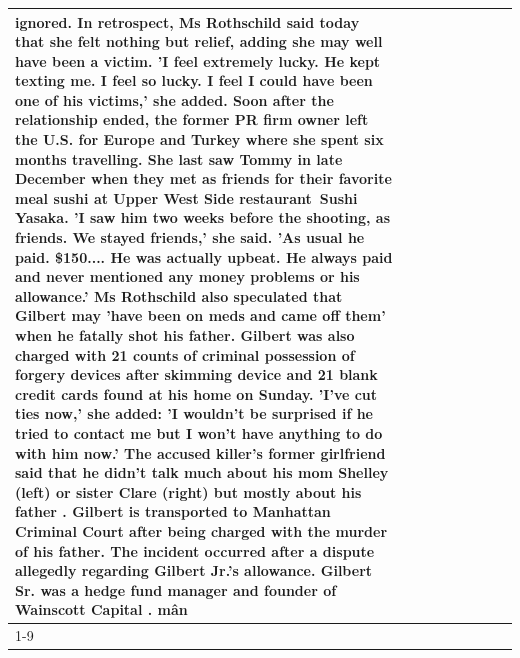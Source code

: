 \begin{table}[H]
\begin{tabular}{lllrlllll}
ignored. In retrospect, Ms Rothschild said today that she felt nothing but relief, adding she may well have been a victim. 'I feel extremely lucky. He kept texting me. I feel so lucky. I feel I could have been one of his victims,' she added. Soon after the relationship ended, the former PR firm owner left the U.S. for Europe and Turkey where she spent six months  travelling. She last saw Tommy in late December when they met as friends for their favorite meal sushi at Upper West Side restaurant Sushi Yasaka. 'I saw him two weeks before the shooting, as friends. We stayed friends,' she said. 'As usual he paid. \$150.... He was actually upbeat. He always paid and never mentioned any money problems or his allowance.' Ms Rothschild also speculated that Gilbert may 'have been on meds and came off them' when he fatally shot his father. Gilbert was also charged with 21 counts of criminal possession of forgery devices after skimming device and 21 blank credit cards found at his home on Sunday. 'I've cut ties now,' she added: 'I wouldn’t be surprised if he tried to contact me but I won’t have anything to do with him now.' The accused killer's former girlfriend said that he didn't talk much about his mom Shelley (left) or sister Clare (right) but mostly about his father . Gilbert is transported to Manhattan Criminal Court  after being charged with the murder of his father. The incident occurred after a dispute allegedly regarding Gilbert Jr.'s allowance. Gilbert Sr. was a hedge fund manager and founder of Wainscott Capital . mân \\
\cline{1-9}

\end{tabular}
\end{table}
